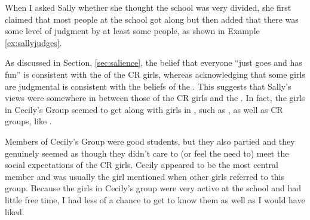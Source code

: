When I asked Sally whether she thought the school was very divided, she first claimed that most people at the school got along but then added that there was some level of judgment by at least some people, as shown in Example \ref{ex:sallyjudges}.

\label{ex:sallyjudges}

\noindent As discussed in Section, \ref{sec:salience}, the belief that everyone ``just goes and has fun'' is consistent with the  of the CR girls, whereas acknowledging that some girls are judgmental is consistent with the beliefs of the . This suggests that Sally's views were somewhere in between those of the CR girls and the .  In fact, the girls in Cecily's Group seemed to get along with girls in , such as , as well as CR groups, like . 

Members of Cecily's Group were good students, but they also partied and they genuinely seemed as though they didn't care to (or feel the need to) meet the social expectations of the CR girls. Cecily appeared to be the most central member and was usually the girl mentioned when other girls referred to this group. Because the girls in Cecily's group were very active at the school and had little free time, I had less of a chance to get to know them as well as I would have liked. 




